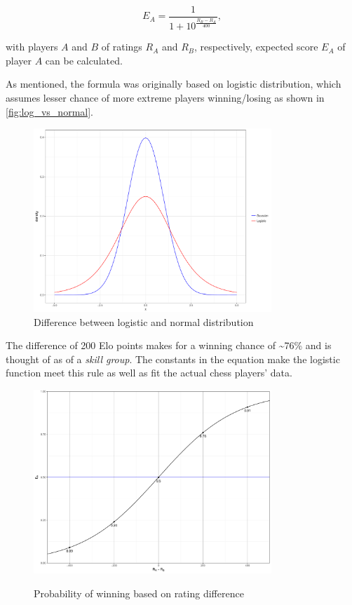 \begin{equation}
E_A = \frac{1}{1+10^\frac{R_B-R_A}{400}},
\label{eq:expected_score}
\end{equation}

\noindent with players $A$ and $B$ of ratings $R_A$ and $R_B$, respectively, expected score $E_A$ of player $A$ can be calculated.

As mentioned, the formula was originally based on logistic distribution, which assumes lesser chance of more extreme players winning/losing as shown in \autoref{fig:log_vs_normal}.

\begin{figure}[H]
\centering
\includegraphics[width=0.8\textwidth]{figs/logistic_vs_gauss}
\caption{Difference between logistic and normal distribution}
\label{fig:log_vs_normal}
\end{figure}

The difference of 200 Elo points makes for a winning chance of \textasciitilde 76\% and is thought of as of a \textit{skill group}. The constants in the equation make the logistic function meet this rule as well as fit the actual chess players' data.

\begin{figure}[H]
\centering
\includegraphics[width=0.8\textwidth]{figs/elo_logistic_function}
\label{Expected score equation}
\caption{Probability of winning based on rating difference}
\end{figure}

